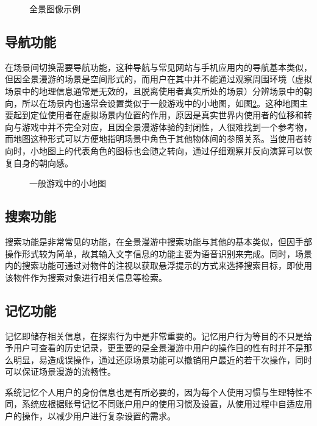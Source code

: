 \begin{figure}[htp]
\centering
{}
\caption{全景图像示例}
\label{fig:hongcun}
\end{figure}

\subsection{导航功能}
在场景间切换需要导航功能，这种导航与常见网站与手机应用内的导航基本类似，但因全景漫游的场景是空间形式的，而用户在其中并不能通过观察周围环境（虚拟场景中的地理信息通常是无效的，且脱离使用者真实所处的场景）分辨场景中的朝向，所以在场景内也通常会设置类似于一般游戏中的小地图，如图\ref{fig:minimap}。这种地图主要起到定位使用者在虚拟场景内位置的作用，原因是真实世界内使用者的位移和转向与游戏中并不完全对应，且因全景漫游体验的封闭性，人很难找到一个参考物，而地图这种形式可以方便地指明场景中角色于其他物体间的参照关系。当使用者转向时，小地图上的代表角色的图标也会随之转向，通过仔细观察并反向演算可以恢复自身的朝向感。

\begin{figure}[htp]
\centering
{}
\caption{一般游戏中的小地图}
\label{fig:minimap}
\end{figure}

\subsection{搜索功能}
搜索功能是非常常见的功能，在全景漫游中搜索功能与其他的基本类似，但因手部操作形式较为简单，故其输入文字信息的功能主要为语音识别来完成。同时，场景内的搜索功能可通过对物件的注视以获取悬浮提示的方式来选择搜索目标，即使用该物件作为搜索对象进行相关信息等检索。

\subsection{记忆功能}
记忆即储存相关信息，在探索行为中是非常重要的。记忆用户行为等目的不只是给予用户可查看的历史记录，更重要的是全景漫游中用户的操作目的性有时并不是那么明显，易造成误操作，通过还原场景功能可以撤销用户最近的若干次操作，同时可以保证场景漫游的流畅性。

系统记忆个人用户的身份信息也是有所必要的，因为每个人使用习惯与生理特性不同，系统应根据账号记忆不同账户用户的使用习惯及设置，从使用过程中自适应用户的操作，以减少用户进行复杂设置的需求。


